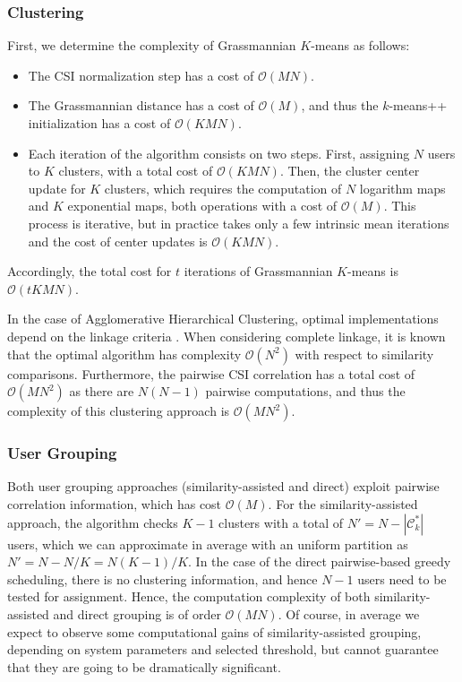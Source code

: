 \subsubsection{Clustering}
First, we determine the complexity of Grassmannian $K$-means as follows:
\begin{itemize}
	\item The CSI normalization step has a cost of $\mathcal{O}(MN)$.
	\item The Grassmannian distance has a cost of $\mathcal{O}(M)$, and thus the $k$-means++ initialization has a cost of $\mathcal{O}(KMN)$.
	\item Each iteration of the algorithm consists on two steps. First, assigning $N$ users to $K$ clusters, with a total cost of $\mathcal{O}(KMN)$. Then, the cluster center update for $K$ clusters, which requires the computation of $N$ logarithm maps and $K$ exponential maps, both operations with a cost of $\mathcal{O}(M)$. This process is iterative, but in practice takes only a few intrinsic mean iterations and the cost of center updates is $\mathcal{O}(KMN)$.
\end{itemize}
Accordingly, the total cost for $t$ iterations
of  Grassmannian $K$-means is $\mathcal{O}(tKMN)$.

In the case of Agglomerative Hierarchical Clustering, optimal implementations depend on the linkage criteria \cite{zaki14}.
When considering complete linkage, it is known that the optimal algorithm has complexity $\mathcal{O}(N^2)$ with respect to similarity comparisons. Furthermore, the pairwise CSI correlation has a total cost of $\mathcal{O}(MN^2)$ as there are $N(N-1)$ pairwise computations, and thus the complexity of this clustering approach is $\mathcal{O}(MN^2)$.

\subsubsection{User Grouping}
Both user grouping approaches (similarity-assisted and direct) exploit pairwise correlation information, which has cost $\mathcal{O}(M)$.
For the similarity-assisted approach, the algorithm checks $K-1$ clusters with a total of $N'=N-|\mathcal{C}_k^*|$ users, which we can approximate in average with an uniform partition as $N'=N-N/K=N(K-1)/K$. In the case of the direct pairwise-based greedy scheduling, there is no clustering information, and hence $N-1$ users need to be tested for assignment.
Hence, the computation complexity of both similarity-assisted and direct grouping is of order $\mathcal{O}(MN)$. Of course, in average we expect to observe some computational gains of similarity-assisted grouping, depending on system parameters and selected threshold, but cannot guarantee that they are going to be dramatically significant.

